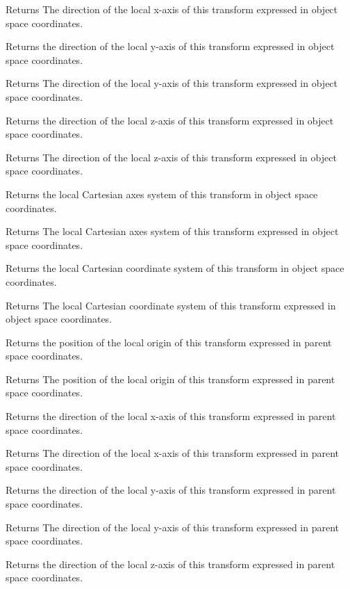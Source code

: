 \begin{DoxyReturn}{Returns}
The direction of the local x-\/axis of this transform expressed in object space coordinates.
\end{DoxyReturn}
Returns the direction of the local y-\/axis of this transform expressed in object space coordinates.

\begin{DoxyReturn}{Returns}
The direction of the local y-\/axis of this transform expressed in object space coordinates.
\end{DoxyReturn}
Returns the direction of the local z-\/axis of this transform expressed in object space coordinates.

\begin{DoxyReturn}{Returns}
The direction of the local z-\/axis of this transform expressed in object space coordinates.
\end{DoxyReturn}
Returns the local Cartesian axes system of this transform in object space coordinates.

\begin{DoxyReturn}{Returns}
The local Cartesian axes system of this transform expressed in object space coordinates.
\end{DoxyReturn}
Returns the local Cartesian coordinate system of this transform in object space coordinates.

\begin{DoxyReturn}{Returns}
The local Cartesian coordinate system of this transform expressed in object space coordinates.
\end{DoxyReturn}
Returns the position of the local origin of this transform expressed in parent space coordinates.

\begin{DoxyReturn}{Returns}
The position of the local origin of this transform expressed in parent space coordinates.
\end{DoxyReturn}
Returns the direction of the local x-\/axis of this transform expressed in parent space coordinates.

\begin{DoxyReturn}{Returns}
The direction of the local x-\/axis of this transform expressed in parent space coordinates.
\end{DoxyReturn}
Returns the direction of the local y-\/axis of this transform expressed in parent space coordinates.

\begin{DoxyReturn}{Returns}
The direction of the local y-\/axis of this transform expressed in parent space coordinates.
\end{DoxyReturn}
Returns the direction of the local z-\/axis of this transform expressed in parent space coordinates.

